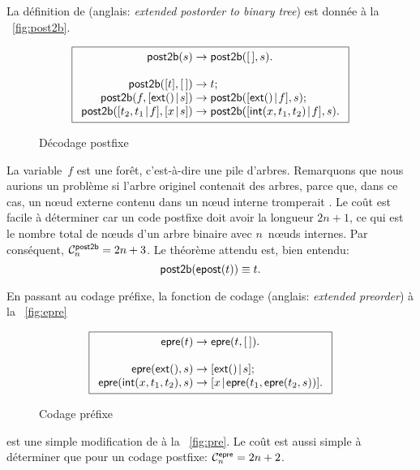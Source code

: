 La définition de 
(anglais: \emph{extended postorder to binary tree}) est donnée à la
\fig~\vref{fig:post2b}.
\begin{figure}
\begin{equation*}
\boxed{
\begin{array}{r@{\;}c@{\;}l}
\fun{post2b}(s) & \rightarrow & \fun{post2b}(\el,s).\\
\\
\fun{post2b}([t],\el) & \rightarrow & t;\\
\fun{post2b}(f,\cons{\fun{ext}()}{s}) & \rightarrow & \fun{post2b}(\cons{\fun{ext}()}{f},s);\\
\fun{post2b}(\cons{t_2,t_1}{f},\cons{x}{s}) & \rightarrow & \fun{post2b}(\cons{\fun{int}(x,t_1,t_2)}{f},s).
\end{array}}
\end{equation*}
\caption{Décodage postfixe}
\label{fig:post2b}
\end{figure}
La variable~\(f\) est une forêt, c'est-à-dire une
pile d'arbres. Remarquons que nous aurions un problème si l'arbre
originel contenait des arbres, parce que, dans ce cas, un nœud
externe contenu dans un nœud interne tromperait
. Le coût est facile à
déterminer car un code postfixe doit avoir la longueur \(2n+1\), ce
qui est le nombre total de nœuds d'un arbre binaire avec
\(n\)~nœuds internes. Par conséquent, \(\C{\fun{post2b}}{n} = 2n +
3\). Le théorème attendu est, bien
entendu:
\begin{equation}
\fun{post2b}(\fun{epost}(t)) \equiv t.
\label{thm_post2b_epost}
\end{equation}

En passant au codage préfixe, la fonction de codage
(anglais: \emph{extended preorder}) à la \fig~\vref{fig:epre}
\begin{figure}[b]
\begin{equation*}
\boxed{
\begin{array}{r@{\;}c@{\;}l}
\fun{epre}(t) & \rightarrow & \fun{epre}(t,\el).\\
\\
\fun{epre}(\fun{ext}(),s) & \rightarrow
  & \cons{\fun{ext}()}{s};\\
\fun{epre}(\fun{int}(x,t_1,t_2),s) & \rightarrow
  & \cons{x}{\fun{epre}(t_1,\fun{epre}(t_2,s))}.
\end{array}}
\end{equation*}
\caption{Codage préfixe}
\label{fig:epre}
\end{figure}
est une simple modification de  à la
\fig~\vref{fig:pre}. Le coût est aussi simple à déterminer que pour un
codage postfixe: \(\C{\fun{epre}}{n} =
2n+2\).

